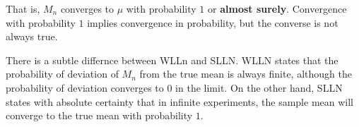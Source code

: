 \documentclass[../probability-notes.tex]{subfiles}
\begin{document}
    That is, $M_{n}$ converges to $\mu$ with probability $1$ or \textbf{almost surely}. Convergence with probability $1$ implies convergence in probability, but the converse is not always true.\newline

    There is a subtle differnce between WLLn and SLLN. WLLN states that the probability of deviation of $M_{n}$ from the true mean is always finite, although the probability of deviation converges to $0$ in the limit. On the other hand, SLLN states with absolute certainty that in infinite experiments, the sample mean will converge to the true mean with probability $1$.
\end{document}
